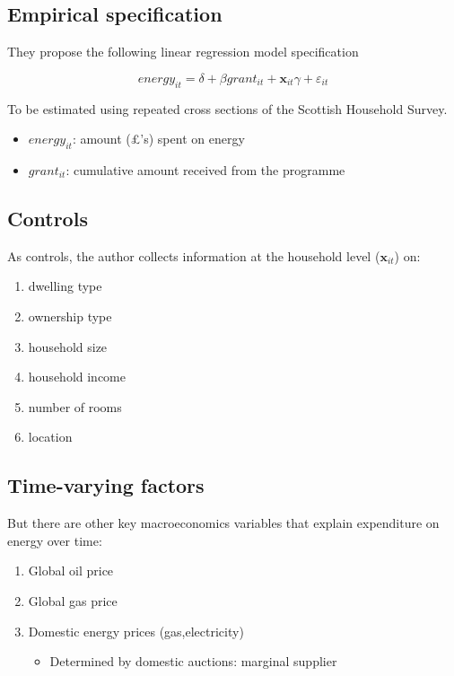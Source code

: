 \documentclass[
  letterpaper,
  DIV=11,
  numbers=noendperiod]{scrartcl}
\providecommand{\tightlist}{%
  \setlength{\itemsep}{0pt}\setlength{\parskip}{0pt}}
\begin{document}
\subsection{Empirical specification}\label{empirical-specification}

They propose the following linear regression model specification

\[
  energy_{it} = \delta + \beta grant_{it} + \mathbf{x}_{it}\gamma + \varepsilon_{it}
\]

To be estimated using repeated cross sections of the Scottish Household
Survey.

\begin{itemize}
\item
  \(energy_{it}\): amount (£'s) spent on energy
\item
  \(grant_{it}\): cumulative amount received from the programme
\end{itemize}

\subsection{Controls}\label{controls}

As controls, the author collects information at the household level
(\(\mathbf{x}_{it}\)) on:

\begin{enumerate}
\def\labelenumi{\arabic{enumi}.}
\item
  dwelling type
\item
  ownership type
\item
  household size
\item
  household income
\item
  number of rooms
\item
  location
\end{enumerate}

\subsection{Time-varying factors}\label{time-varying-factors}

But there are other key macroeconomics variables that explain
expenditure on energy over time:

\begin{enumerate}
\def\labelenumi{\arabic{enumi}.}
\item
  Global oil price
\item
  Global gas price
\item
  Domestic energy prices (gas,electricity)

  \begin{itemize}
  \tightlist
  \item
    Determined by domestic auctions: marginal supplier
  \end{itemize}
\end{enumerate}
\end{document}
